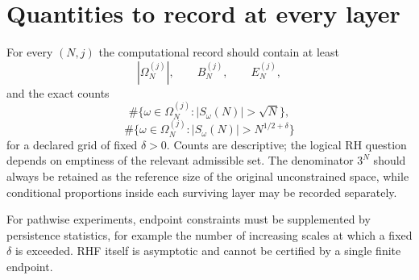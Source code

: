 \documentclass[11pt]{article}
\newcommand{\Om}{\Omega}
\begin{document}
\section{Quantities to record at every layer}
For every $(N,j)$ the computational record should contain at least
\[
 |\Om_N^{(j)}|,
 \qquad
 B_N^{(j)},
 \qquad
 E_N^{(j)},
\]
and the exact counts
\[
 \#\{\omega\in\Om_N^{(j)}:|S_\omega(N)|>\sqrt N\},
\]
\[
 \#\{\omega\in\Om_N^{(j)}:|S_\omega(N)|>N^{1/2+\delta}\}
\]
for a declared grid of fixed $\delta>0$.  Counts are descriptive; the logical RH question depends on emptiness of the relevant admissible set.  The denominator $3^N$ should always be retained as the reference size of the original unconstrained space, while conditional proportions inside each surviving layer may be recorded separately.

For pathwise experiments, endpoint constraints must be supplemented by persistence statistics, for example the number of increasing scales at which a fixed $\delta$ is exceeded.  RHF itself is asymptotic and cannot be certified by a single finite endpoint.
\end{document}
